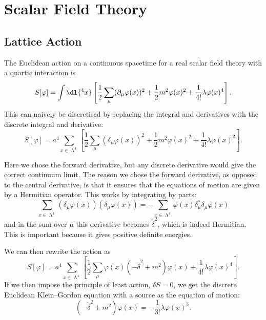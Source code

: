 \documentclass[fleqn]{NotesClass}
\newcommand{\lattice}[1][4]{\upLambda^{#1}}
\newcommand{\forwardDerivative}{\delta}
\newcommand{\backwardDerivative}{\delta^*}
\newcommand{\mixedLaplacian}{{\widetilde{\delta}^2}}
\begin{document}
    \chapter{Scalar Field Theory}
    \section{Lattice Action}
    The Euclidean action on a continuous spacetime for a real scalar field theory with a quartic interaction is
    \begin{equation}
        S[\varphi] = \int \dl{^4x} \left[ \frac{1}{2}\sum_\mu (\partial_\mu \varphi(x))^2 + \frac{1}{2}m^2\varphi(x)^2 + \frac{1}{4!}\lambda \varphi(x)^4 \right].
    \end{equation}
    This can naively be discretised by replacing the integral and derivatives with the discrete integral and derivative:
    \begin{equation}
        S[\varphi] = a^4 \sum_{x\in\lattice} \left[ \frac{1}{2}\sum_\mu (\forwardDerivative_\mu \varphi(x))^2 + \frac{1}{2}m^2\varphi(x)^2 + \frac{1}{4!}\lambda \varphi(x)^2 \right].
    \end{equation}
    
    Here we chose the forward derivative, but any discrete derivative would give the correct continuum limit.
    The reason we chose the forward derivative, as opposed to the central derivative, is that it ensures that the equations of motion are given by a Hermitian operator.
    This works by integrating by parts:
    \begin{equation}
        \sum_{x\in\lattice} (\forwardDerivative_\mu \varphi(x))(\forwardDerivative_\mu \varphi(x)) = -\sum_{x\in\lattice} \varphi(x) \backwardDerivative_\mu\forwardDerivative_\mu \varphi(x)
    \end{equation}
    and in the sum over \(\mu\) this derivative becomes \(\mixedLaplacian\), which is indeed Hermitian.
    This is important because it gives positive definite energies.
    
    We can then rewrite the action as
    \begin{equation}
        S[\varphi] = a^4 \sum_{x\in\lattice} \left[ \frac{1}{2}\sum_\mu \varphi(x)(-\mixedLaplacian + m^2)\varphi(x) + \frac{1}{4!}\lambda\varphi(x)^4 \right].
    \end{equation}
    If we then impose the principle of least action, \(\delta S = 0\), we get the discrete Euclidean Klein--Gordon equation with a source as the equation of motion:
    \begin{equation}
        (-\mixedLaplacian + m^2)\varphi(x) = -\frac{1}{3!}\lambda \varphi(x)^3.
    \end{equation}
    
\end{document}
